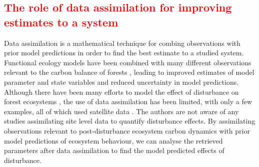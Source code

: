 \documentclass[draft,linenumbers]{agujournal}
\begin{document}
\subsection{\textcolor{red}{The role of data assimilation for improving estimates to a system}}
Data assimilation is a mathematical technique for combing observations with prior model predictions in order to find the best estimate to a studied system. Functional ecology models have been combined with many different observations relevant to the carbon balance of forests \citep{zobitz2011primer, fox2009reflex, richardson2010estimating, Quaife2008, Zobitz2014, Niu2014}, leading to improved estimates of model parameter and state variables and reduced uncertainty in model predictions. Although there have been many efforts to model the effect of disturbance on forest ecosystems \citep{seidl2011modelling, thornton2002modeling}, the use of data assimilation has been limited, with only a few examples, all of which used satellite data \citep{kantzas2015improving, hilker2009new}. The authors are not aware of any studies assimilating site level data to quantify disturbance effects. By assimilating observations relevant to post-disturbance ecosystem carbon dynamics with prior model predictions of ecosystem behaviour, we can analyse the retrieved parameters after data assimilation to find the model predicted effects of disturbance.   
\end{document}
